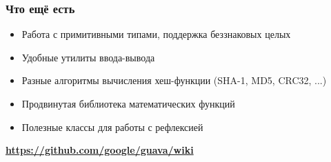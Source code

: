 \documentclass[xetex,mathserif,serif]{beamer}
\begin{document}
	\begin{frame}
		\frametitle{Что ещё есть}
		\begin{itemize}
			\item Работа с примитивными типами, поддержка беззнаковых целых
			\item Удобные утилиты ввода-вывода
			\item Разные алгоритмы вычисления хеш-функции (SHA-1, MD5, CRC32, ...)
			\item Продвинутая библиотека математических функций
			\item Полезные классы для работы с рефлексией
		\end{itemize}
		\begin{center}
			\textbf{\url{https://github.com/google/guava/wiki}}
		\end{center}
	\end{frame}
\end{document}
